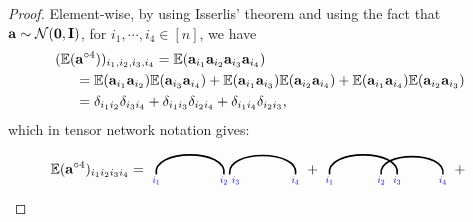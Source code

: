 \begin{enumerate}
\begin{theorem}
\begin{proof}
    Element-wise, by using Isserlis’
    theorem and using the fact that $\mathbf{a}\sim\mathcal{N}(\mathbf{0},\mathbf{I})$, for $i_1,\cdots,i_4\in[n]$, we have
\begin{align*}
(\mathbb{E}(&\mathbf{a}^{\circ 4}))_{i_1,i_2,i_3,i_4} 
=
    \mathbb{E}(\mathbf{a}_{i_1}\mathbf{a}_{i_2}\mathbf{a}_{i_3}\mathbf{a}_{i_4})\\
&= 
    \mathbb{E}(\mathbf{a}_{i_1}\mathbf{a}_{i_2})\mathbb{E}(\mathbf{a}_{i_3}\mathbf{a}_{i_4}) + \mathbb{E}(\mathbf{a}_{i_1}\mathbf{a}_{i_3})\mathbb{E}(\mathbf{a}_{i_2}\mathbf{a}_{i_4})
    +\mathbb{E}(\mathbf{a}_{i_1}\mathbf{a}_{i_4})\mathbb{E}(\mathbf{a}_{i_2}\mathbf{a}_{i_3})\\
&=
    \delta_{i_1i_2}\delta_{i_3i_4} + \delta_{i_1i_3}\delta_{i_2i_4} + \delta_{i_1i_4}\delta_{i_2i_3},
\end{align*}
which in tensor network notation gives:
\begin{align*}
\EE(\ab^{\outprod 4})_{i_1i_2i_3i_4}
=
\begin{tikzpicture}[baseline=\baseline]
    \tikzset{tensor/.style = {minimum size = 0.5cm,shape = circle,thick,draw=black,inner sep = 0pt}, edge/.style = {thick,line width=.4mm},every loop/.style={}}
    \def\y{0}
    \def\x{0}
    \draw[edge] (\x+0.15,\y-0.1) to [out=100,in=80] (\x+1.85,\y-0.1);
    \draw[edge] (\x+2,\y-0.1) to [out=100,in=80] (\x+3.65,\y-0.1);
    \node[draw=none] () at (\x+0.15,\y-0.25) {\scalebox{0.7}{\indcolor{$i_1$}}};
    \node[draw=none] () at (\x+1.85,\y-0.25) {\scalebox{0.7}{\indcolor{$i_2$}}};
    \node[draw=none] () at (\x+2.15,\y-0.25) {\scalebox{0.7}{\indcolor{$i_3$}}};
    \node[draw=none] () at (\x+3.65,\y-0.25) {\scalebox{0.7}{\indcolor{$i_4$}}};
\end{tikzpicture}
+
\begin{tikzpicture}[baseline=\baseline]
    \tikzset{tensor/.style = {minimum size = 0.5cm,shape = circle,thick,draw=black,inner sep = 0pt}, edge/.style = {thick,line width=.4mm},every loop/.style={}}
    \def\y{0}
    \def\x{0}
    \draw[edge] (\x+0.15,\y-0.1) to [out=100,in=80] (\x+1.85,\y-0.1);
    \draw[edge] (\x+1.45,\y-0.1) to [out=100,in=80] (\x+3,\y-0.1);
    \node[draw=none] () at (\x+0.15,\y-0.25) {\scalebox{0.7}{\indcolor{$i_1$}}};
    \node[draw=none] () at (\x+3,\y-0.25) {\scalebox{0.7}{\indcolor{$i_4$}}};
    \node[draw=none] () at (\x+1.85,\y-0.25) {\scalebox{0.7}{\indcolor{$i_3$}}};
    \node[draw=none] () at (\x+1.45,\y-0.25) {\scalebox{0.7}{\indcolor{$i_2$}}};
\end{tikzpicture}
+
    \begin{tikzpicture}[baseline=\baseline]
    \tikzset{tensor/.style = {minimum size = 0.5cm,shape = circle,thick,draw=black,inner sep = 0pt}, edge/.style = {thick,line width=.4mm},every loop/.style={}}

\end{tikzpicture}
\end{align*}
\end{proof}
\end{theorem}
\end{enumerate}

